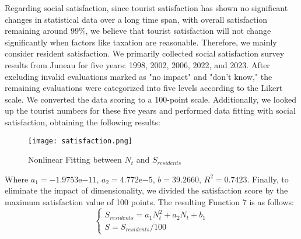\documentclass[12pt]{article}  %
\begin{document}
Regarding social satisfaction, since tourist satisfaction has shown no significant changes in statistical data over a long time span, with overall satisfaction remaining around 99\%, we believe that tourist satisfaction will not change significantly when factors like taxation are reasonable. Therefore, we mainly consider resident satisfaction.
We primarily collected social satisfaction survey results from Juneau for five years: 1998, 2002, 2006, 2022, and 2023. After excluding invalid evaluations marked as "no impact" and "don't know," the remaining evaluations were categorized into five levels according to the Likert scale. We converted the data scoring to a 100-point scale. Additionally, we looked up the tourist numbers for these five years and performed data fitting with social satisfaction, obtaining the following results:
\begin{figure}[H]
	\centering
	\texttt{[image: satisfaction.png]}
	\caption{Nonlinear Fitting between $N_t$ and $S_{residents}$}\label{fig:satisfaction}
\end{figure}
Where $a_1 = -1.9753 \mathrm{e}{-11}$, $a_2 = 4.772\mathrm{e}{-5}$, $b = 39.2660$, $R^2 = 0.7423$. Finally, to eliminate the impact of dimensionality, we divided the satisfaction score by the maximum satisfaction value of 100 points. The resulting Function 7 is as follows:
\begin{equation}
	\begin{cases}
		S_{residents}=a_{1}N_{t}^2+a_{2}N_{t} + b_{1} \\
		S=S_{residents}/100
	\end{cases}
\end{equation}
\end{document}
